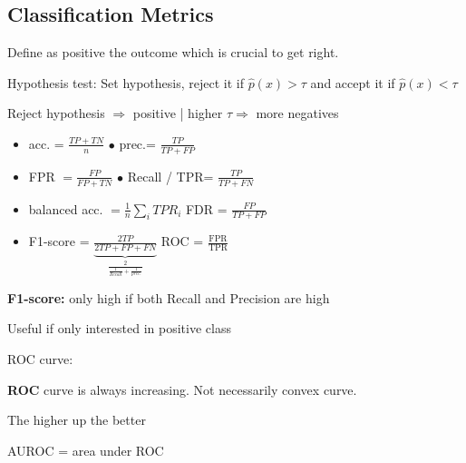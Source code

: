 \subsection{Classification Metrics}

Define as positive the outcome which is crucial to get right.

Hypothesis test: Set hypothesis, reject it if $\hat{p}(x) > \tau$ and accept it if $\hat{p}(x) < \tau$

Reject hypothesis $\Rightarrow$ positive | higher $\tau \Rightarrow$ more negatives 



\begin{itemize}
    \item \color{Green}acc.\color{black} = $\frac{TP + TN}{n}$ \hspace{0.1cm} $\bullet$ \color{Green}prec.\color{black}= $ \frac{TP}{TP+FP}$
    \item \color{Red}FPR\color{black} $= \frac{FP}{FP+TN}$ \hspace{0.1cm} $\bullet$ \color{Green}Recall / TPR\color{black}= $\frac{TP}{TP+FN}$
    \item \color{Green}balanced acc.\color{black} $= \frac{1}{n}\sum_iTPR_i$ \hspace{0.1cm} \color{Red}FDR\color{black} = $\frac{FP}{TP + FP}$
    \item \color{Green}F1-score\color{black} = $\underbrace{\frac{2TP}{2TP +FP + FN}}_{\frac{2}{\frac{1}{Recall} + \frac{1}{prec.}}}$ \hspace{0.1cm} \color{Green}ROC\color{black} = $\frac{\text{FPR}}{\text{TPR}}$
\end{itemize}

\textbf{F1-score:} only high if both Recall and Precision are high

Useful if only interested in positive class

ROC curve:
\begin{multicols*}{2}
    \begin{center}
    \end{center}
    \columnbreak
    \textbf{ROC} curve is always increasing. Not necessarily convex curve.

    The higher up the better

    AUROC = area under ROC

\end{multicols*}
